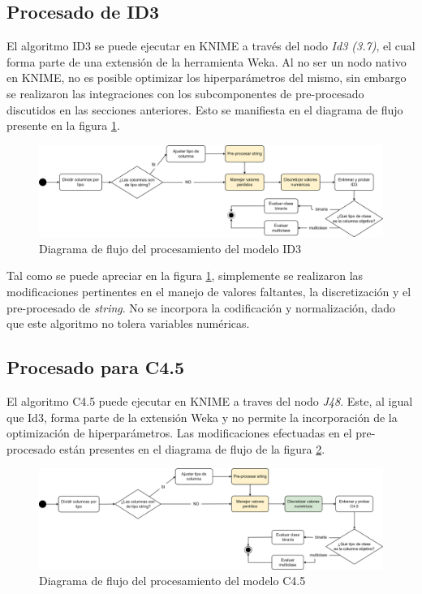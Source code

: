 \subsection{Procesado de ID3}
El algoritmo ID3 se puede ejecutar en KNIME a través del nodo \textit{Id3 (3.7)}, el cual forma parte de una extensión de la herramienta Weka. Al no ser un nodo nativo en KNIME, no es posible optimizar los hiperparámetros del mismo, sin embargo se realizaron las integraciones con los subcomponentes de pre-procesado discutidos en las secciones anteriores. Esto se manifiesta en el diagrama de flujo presente en la figura \ref{fig:procesado-id3}.

\begin{figure}[H]
	\centering
	\includegraphics[width=1\linewidth]{"figuras/capi 2/modelos/procesado id3.drawio"}
	\caption{Diagrama de flujo del procesamiento del modelo ID3}
	\label{fig:procesado-id3}
\end{figure}

Tal como se puede apreciar en la figura \ref{fig:procesado-id3}, simplemente se realizaron las modificaciones pertinentes en el manejo de valores faltantes, la discretización y el pre-procesado de \textit{string}. No se incorpora la codificación y normalización, dado que este algoritmo no tolera variables numéricas.

\subsection{Procesado para C4.5}
El algoritmo C4.5 puede ejecutar en KNIME a traves del nodo \textit{J48}. Este, al igual que Id3, forma parte de la extensión Weka y no permite la incorporación de la optimización de hiperparámetros. Las modificaciones efectuadas en el pre-procesado están presentes en el diagrama de flujo de la figura \ref{fig:procesado-c4pt5}.

\begin{figure}[h]
	\centering
	\includegraphics[width=1\linewidth]{"figuras/capi 2/modelos/procesado c4pt5.drawio"}
	\caption{Diagrama de flujo del procesamiento del modelo C4.5}
	\label{fig:procesado-c4pt5}
\end{figure}

